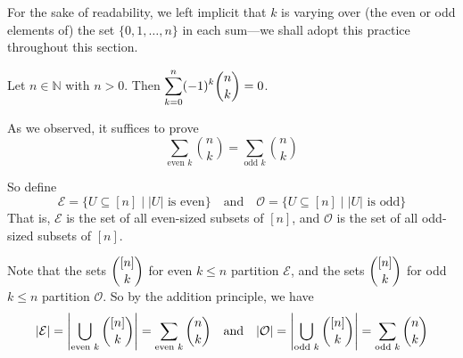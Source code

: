 For the sake of readability, we left implicit that $k$ is varying over (the even or odd elements of) the set $\{ 0, 1, \dots, n \}$ in each sum---we shall adopt this practice throughout this section.

\begin{proposition}
\label{propAlternatingSumOfBinomialCoefficientsByBijection}
Let $n \in \mathbb{N}$ with $n>0$. Then $\displaystyle \sum_{k=0}^n (-1)^k \dbinom{n}{k} = 0$.
\end{proposition}

\begin{cproof}
As we observed, it suffices to prove
\[ \sum_{\text{even } k} \binom{n}{k} = \sum_{\text{odd } k} \binom{n}{k} \]

So define
\[ \mathcal{E} = \{ U \subseteq [n] \mid |U| \text{ is even} \} \quad \text{and} \quad \mathcal{O} = \{ U \subseteq [n] \mid |U| \text{ is odd} \} \]
That is, $\mathcal{E}$ is the set of all even-sized subsets of $[n]$, and $\mathcal{O}$ is the set of all odd-sized subsets of $[n]$.

Note that the sets $\dbinom{[n]}{k}$ for even $k \le n$ partition $\mathcal{E}$, and the sets $\dbinom{[n]}{k}$ for odd $k \le n$ partition $\mathcal{O}$. So by the addition principle, we have
\[ |\mathcal{E}| = \left| \bigcup_{\text{even } k} \dbinom{[n]}{k} \right| = \sum_{\text{even } k} \dbinom{n}{k} \quad \text{and} \quad |\mathcal{O}| = \left| \bigcup_{\text{odd } k} \dbinom{[n]}{k} \right| = \sum_{\text{odd } k} \dbinom{n}{k} \]


\end{cproof}
